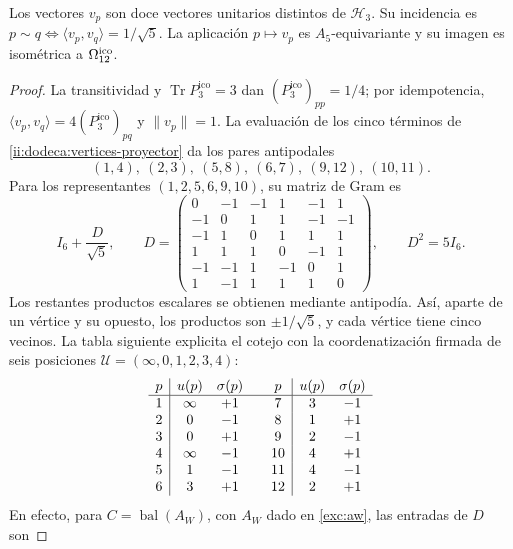 \begin{proposition}
\label{ii:dodeca:realizacion}
Los vectores \(v_p\) son doce vectores unitarios distintos de
\(\mathcal H_3\). Su incidencia es
\(p\sim q\Longleftrightarrow\langle v_p,v_q\rangle=1/\sqrt5\).
La aplicación \(p\mapsto v_p\) es \(A_5\)-equivariante y su imagen
es isométrica a \(\Omega_{12}^{\rm ico}\).
\end{proposition}
\begin{proof}
La transitividad y \(\operatorname{Tr}P_3^{\mathrm{ico}}=3\) dan
\((P_3^{\mathrm{ico}})_{pp}=1/4\); por idempotencia,
\(\langle v_p,v_q\rangle=4(P_3^{\mathrm{ico}})_{pq}\) y \(\|v_p\|=1\).
La evaluación de los cinco términos de
\eqref{ii:dodeca:vertices-proyector} da los pares antipodales
\[
 (1,4),\ (2,3),\ (5,8),\ (6,7),\ (9,12),\ (10,11).
\]
Para los representantes \((1,2,5,6,9,10)\), su matriz de Gram es
\begin{equation}
 I_6+\frac D{\sqrt5},\qquad
 D=\begin{pmatrix}
 0&-1&-1&1&-1&1\\
 -1&0&1&1&-1&-1\\
 -1&1&0&1&1&1\\
 1&1&1&0&-1&1\\
 -1&-1&1&-1&0&1\\
 1&-1&1&1&1&0
 \end{pmatrix},\qquad D^2=5I_6.
 \label{ii:dodeca:gram}
\end{equation}
Los restantes productos escalares se obtienen mediante antipodía.
Así, aparte de un vértice y su opuesto, los productos son
\(\pm1/\sqrt5\), y cada vértice tiene cinco vecinos. La tabla siguiente
explicita el cotejo con la coordenatización firmada de seis posiciones
\(\mathcal U=(\infty,0,1,2,3,4)\):
\begin{equation}
\begin{array}{c|cc@{\qquad}c|cc}
p&u(p)&\sigma(p)&p&u(p)&\sigma(p)\\ \hline
1&\infty&+1&7&3&-1\\
2&0&-1&8&1&+1\\
3&0&+1&9&2&-1\\
4&\infty&-1&10&4&+1\\
5&1&-1&11&4&-1\\
6&3&+1&12&2&+1
\end{array}
\label{ii:dodeca:carta-firmada}
\end{equation}
En efecto, para \(C=\operatorname{bal}(A_W)\), con \(A_W\) dado en
\eqref{exc:aw}, las entradas de \(D\) son

\end{proof}
